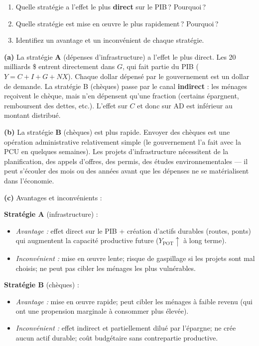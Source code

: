 \begin{enumerate}[label=(\alph*)]
   \item Quelle stratégie a l'effet le plus \textbf{direct} sur le PIB\,? Pourquoi\,?
   \item Quelle stratégie est mise en {\oe}uvre le plus rapidement\,? Pourquoi\,?
   \item Identifiez un avantage et un inconvénient de chaque stratégie.
\end{enumerate}

\begin{reponse}
\textbf{(a)} La stratégie \textbf{A} (dépenses d'infrastructure) a l'effet le plus direct. Les 20 milliards \$ entrent directement dans $G$, qui fait partie du PIB ($Y = C + I + G + NX$). Chaque dollar dépensé par le gouvernement est un dollar de demande. La stratégie B (chèques) passe par le canal \textbf{indirect} : les ménages reçoivent le chèque, mais n'en dépensent qu'une fraction (certains épargnent, remboursent des dettes, etc.). L'effet sur $C$ et donc sur AD est inférieur au montant distribué.

\textbf{(b)} La stratégie \textbf{B} (chèques) est plus rapide. Envoyer des chèques est une opération administrative relativement simple (le gouvernement l'a fait avec la PCU en quelques semaines). Les projets d'infrastructure nécessitent de la planification, des appels d'offres, des permis, des études environnementales --- il peut s'écouler des mois ou des années avant que les dépenses ne se matérialisent dans l'économie.

\textbf{(c)} Avantages et inconvénients :

\textbf{Stratégie A} (infrastructure) :
\begin{itemize}
   \item \textit{Avantage :} effet direct sur le PIB + création d'actifs durables (routes, ponts) qui augmentent la capacité productive future ($Y_{\text{POT}} \uparrow$ à long terme).
   \item \textit{Inconvénient :} mise en {\oe}uvre lente; risque de gaspillage si les projets sont mal choisis; ne peut pas cibler les ménages les plus vulnérables.
\end{itemize}

\textbf{Stratégie B} (chèques) :
\begin{itemize}
   \item \textit{Avantage :} mise en {\oe}uvre rapide; peut cibler les ménages à faible revenu (qui ont une propension marginale à consommer plus élevée).
   \item \textit{Inconvénient :} effet indirect et partiellement dilué par l'épargne; ne crée aucun actif durable; coût budgétaire sans contrepartie productive.
\end{itemize}
\end{reponse}

